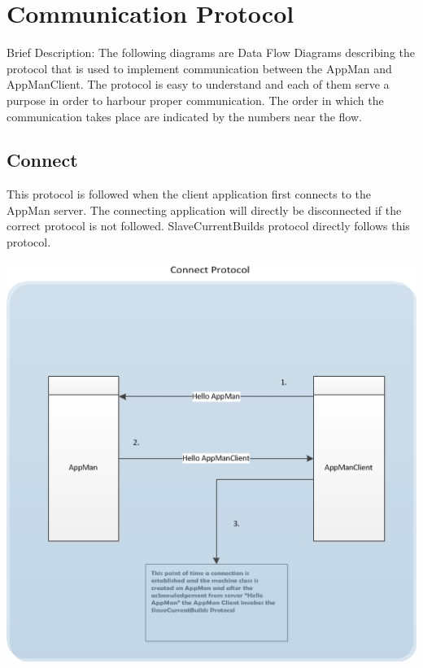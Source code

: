 \documentclass[a4paper,12pt,final]{article}
\begin{document}
\section{Communication Protocol}
Brief Description: The following diagrams are Data Flow Diagrams describing the protocol that is used to implement communication between the AppMan and AppManClient. The protocol is easy to understand and each of them serve a purpose in order to harbour proper communication. The order in which the communication takes place are indicated by the numbers near the flow.

\subsection{Connect}
This protocol is followed when the client application first connects to the AppMan server. The connecting application will directly be disconnected if the correct protocol is not followed. SlaveCurrentBuilds protocol directly follows this protocol.
\begin{center}
\includegraphics[scale=1.0]{CommunicationProtocol/ConnectProtocol.jpg} 
\end{center}
\end{document}
